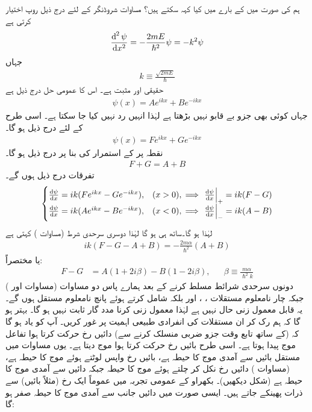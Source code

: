 ہم  کی صورت میں  کے بارے میں کیا کہہ سکتے ہیں؟ مساوات شروڈنگر  کے لئے درج ذیل روپ اختیار کرتی ہے
\begin{align*}
\frac{\dif^{\,2}\psi}{\dif x^2}=-\frac{2mE}{\hslash^2}\psi=-k^2\psi
\end{align*}
 جہاں
\begin{align}\label{مساوات_شروڈنگر_مستقل_کے}
k\equiv\frac{\sqrt{2mE}}{\hslash}
\end{align}
 حقیقی اور مثبت ہے۔ اس کا عمومی حل درج ذیل ہے
\begin{align}\label{مساوات_شروڈنگر_بایاں_حل_ڈیلٹا}
\psi(x)=Ae^{ikx}+Be^{-ikx}
\end{align}
جہاں کوئی بھی جزو بے قابو نہیں بڑھتا ہے لہٰذا انہیں رد نہیں کیا جا سکتا ہے۔ اسی طرح  کے لئے درج ذیل ہو گا۔
\begin{align}\label{مساوات_شروڈنگر_دایاں_حل_ڈیلٹا}
\psi(x)=Fe^{ikx}+Ge^{-ikx}
\end{align}
نقطہ  پر  کے استمرار کی بنا پر درج ذیل ہو گا۔
\begin{align}\label{مساوات_شروڈنگر_شرط_اول}
F+G=A+B
\end{align}
تفرقات درج ذیل ہوں گے۔
\begin{align*}
\begin{cases}
\frac{\dif\psi}{\dif x}=ik(Fe^{ikx}-Ge^{-ikx}),& (x>0),\implies \left.\frac{\dif\psi}{\dif x}\right|_{+}=ik(F-G)\\
\frac{\dif\psi}{\dif x}=ik(Ae^{ikx}-Be^{-ikx}),& (x<0),\implies \left.\frac{\dif\psi}{\dif x}\right|_{-}=ik(A-B)
\end{cases}
\end{align*}
لہٰذا  ہو گا۔ساتھ ہی  ہو گا لہٰذا دوسری سرحدی شرط (مساوات ) کہتی ہے
\begin{align}
ik(F-G-A+B)=-\frac{2m\alpha}{\hslash^2}(A+B)
\end{align}
یا مختصراً:
\begin{align}\label{مساوات_شروڈنگر_شرط_دوم}
F-G&=A(1+2i\beta)-B(1-2i\beta),&&\beta\equiv\frac{m\alpha}{\hslash^2 k}
\end{align}
دونوں سرحدی شرائط مسلط کرنے کے بعد ہمارے پاس دو مساوات (مساوات  اور ) جبکہ چار نامعلوم مستقلات ، ،  اور  بلکہ  شامل کرتے ہوئے پانچ نامعلوم مستقل ہوں گے۔ یہ قابل معمول زنی حال نہیں ہے لہٰذا معمول زنی کرنا مدد گار ثابت نہیں ہو گا۔ بہتر ہو گا کہ ہم رک کر ان مستقلات کی انفرادی طبیعی اہمیت پر غور کریں۔ آپ کو یاد ہو گا کہ  (کے ساتھ تابع وقت جزو ضربی  منسلک کرنے سے) دائیں رخ حرکت کرتا ہوا تفاعل موج پیدا ہوتا ہے۔ اسی طرح  بائیں رخ حرکت کرتا ہوا موج دیتا ہے۔ یوں مساوات  میں مستقل  بائیں سے آمدی موج کا حیطہ ہے،  بائیں رخ واپس لوٹتے ہوئے موج کا حیطہ ہے،  (مساوات ) دائیں رخ نکل کر چلتے ہوئے موج کا حیطہ جبکہ  دائیں سے آمدی موج کا حیطہ ہے (شکل  دیکھیں)۔ بکھراو کے عمومی تجربہ میں عموماً ایک رخ (مثلاً بائیں) سے ذرات پھینکے جاتے ہیں۔ ایسی صورت میں دائیں جانب سے آمدی موج کا حیطہ صفر ہو گا:
